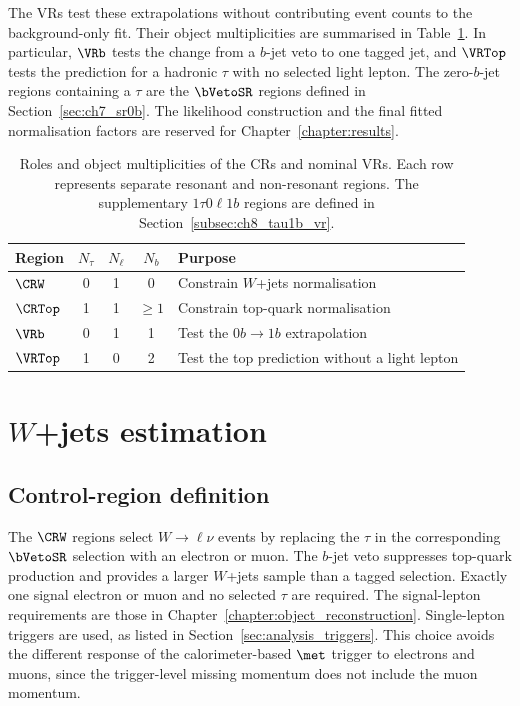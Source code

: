The VRs test these extrapolations without contributing event counts to the background-only fit.
Their object multiplicities are summarised in Table~\ref{tab:ch8_region_roles}.
In particular, $\VRb$ tests the change from a $b$-jet veto to one tagged jet, and $\VRTop$ tests the prediction for a hadronic $\tau$ with no selected light lepton.
The zero-$b$-jet regions containing a $\tau$ are the $\bVetoSR$ regions defined in Section~\ref{sec:ch7_sr0b}.
The likelihood construction and the final fitted normalisation factors are reserved for Chapter~\ref{chapter:results}.

\begin{table}[htbp]
    \centering
    \small
    \caption{Roles and object multiplicities of the CRs and nominal VRs. Each row represents separate resonant and non-resonant regions. The supplementary $1\tau0\ell1b$ regions are defined in Section~\ref{subsec:ch8_tau1b_vr}.}
    \label{tab:ch8_region_roles}
    \begin{tabular}{lcccl}
        \toprule
        Region & $N_\tau$ & $N_\ell$ & $N_b$ & Purpose \\
        \midrule
        $\CRW$ & 0 & 1 & 0 & Constrain $W$+jets normalisation \\
        $\CRTop$ & 1 & 1 & $\geq1$ & Constrain top-quark normalisation \\
        $\VRb$ & 0 & 1 & 1 & Test the $0b\to1b$ extrapolation \\
        $\VRTop$ & 1 & 0 & 2 & Test the top prediction without a light lepton \\
        \bottomrule
    \end{tabular}
\end{table}

\section[W+jets estimation]{$W$+jets estimation}
\label{sec:ch8_wjets}

\subsection{Control-region definition}
\label{subsec:ch8_wcr_definition}

The $\CRW$ regions select $W\to\ell\nu$ events by replacing the $\tau$ in the corresponding $\bVetoSR$ selection with an electron or muon.
The $b$-jet veto suppresses top-quark production and provides a larger $W$+jets sample than a tagged selection.
Exactly one signal electron or muon and no selected $\tau$ are required.
The signal-lepton requirements are those in Chapter~\ref{chapter:object_reconstruction}.
Single-lepton triggers are used, as listed in Section~\ref{sec:analysis_triggers}.
This choice avoids the different response of the calorimeter-based $\met$ trigger to electrons and muons, since the trigger-level missing momentum does not include the muon momentum.

